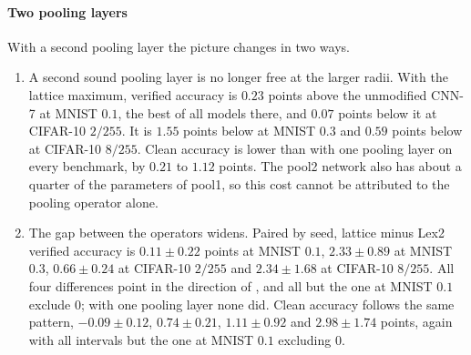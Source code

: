 \documentclass[preprint,12pt]{elsarticle}
\theoremstyle{definition}
\begin{document}
\paragraph{Two pooling layers} With a second pooling layer the picture changes in two ways.
\begin{enumerate}[leftmargin=*]
\item A second sound pooling layer is no longer free at the larger radii. With the lattice maximum, verified accuracy is $0.23$ points above the unmodified CNN-7 at MNIST $0.1$, the best of all models there, and $0.07$ points below it at CIFAR-10 $2/255$. It is $1.55$ points below at MNIST $0.3$ and $0.59$ points below at CIFAR-10 $8/255$. Clean accuracy is lower than with one pooling layer on every benchmark, by $0.21$ to $1.12$ points. The pool2 network also has about a quarter of the parameters of pool1, so this cost cannot be attributed to the pooling operator alone.
\item The gap between the operators widens. Paired by seed, lattice minus Lex2 verified accuracy is $0.11\pm0.22$ points at MNIST $0.1$, $2.33\pm0.89$ at MNIST $0.3$, $0.66\pm0.24$ at CIFAR-10 $2/255$ and $2.34\pm1.68$ at CIFAR-10 $8/255$. All four differences point in the direction of , and all but the one at MNIST $0.1$ exclude $0$; with one pooling layer none did. Clean accuracy follows the same pattern, $-0.09\pm0.12$, $0.74\pm0.21$, $1.11\pm0.92$ and $2.98\pm1.74$ points, again with all intervals but the one at MNIST $0.1$ excluding $0$.
\end{enumerate}
\end{document}
